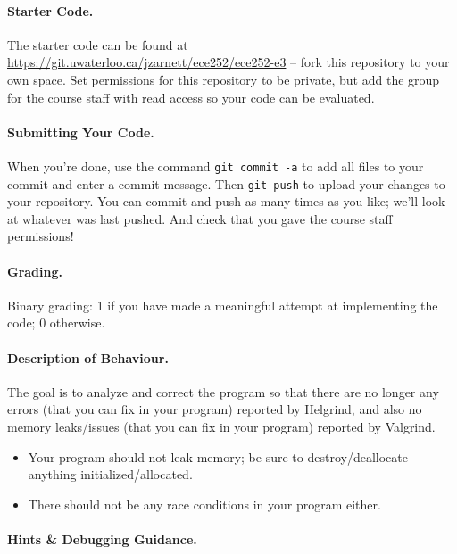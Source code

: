 \paragraph{Starter Code.} The starter code can be found at \url{https://git.uwaterloo.ca/jzarnett/ece252/ece252-e3} -- fork this repository to your own space. Set permissions for this repository to be private, but add the group for the course staff with read access so your code can be evaluated.

\paragraph{Submitting Your Code.} When you're done, use the command \texttt{git commit -a} to add all files to your commit and enter a commit message. Then \texttt{git push} to upload your changes to your repository. You can commit and push as many times as you like; we'll look at whatever was last pushed. And check that you gave the course staff permissions!

\paragraph{Grading.} Binary grading: 1 if you have made a meaningful attempt at implementing the code; 0 otherwise.

\paragraph{Description of Behaviour.} The goal is to analyze and correct the program so that there are no longer any errors (that you can fix in your program) reported by Helgrind, and also no memory leaks/issues (that you can fix in your program) reported by Valgrind.

\begin{itemize}

	\item Your program should not leak memory; be sure to destroy/deallocate anything initialized/allocated.

	\item There should not be any race conditions in your program either.
\end{itemize}


\paragraph{Hints \& Debugging Guidance.}

